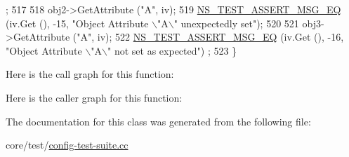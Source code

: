\begin{DoxyCode}
      ;
517 
518   obj2->GetAttribute (\textcolor{stringliteral}{"A"}, iv);
519   \hyperlink{group__testing_ga2a9d78cffb3db8e867c35fff0b698cf5}{NS\_TEST\_ASSERT\_MSG\_EQ} (iv.Get (), -15, \textcolor{stringliteral}{"Object Attribute \(\backslash\)"A\(\backslash\)" unexpectedly set"});
520 
521   obj3->GetAttribute (\textcolor{stringliteral}{"A"}, iv);
522   \hyperlink{group__testing_ga2a9d78cffb3db8e867c35fff0b698cf5}{NS\_TEST\_ASSERT\_MSG\_EQ} (iv.Get (), -16, \textcolor{stringliteral}{"Object Attribute \(\backslash\)"A\(\backslash\)" not set as expected"})
      ;
523 \}
\end{DoxyCode}


Here is the call graph for this function\+:




Here is the caller graph for this function\+:




The documentation for this class was generated from the following file\+:\begin{DoxyCompactItemize}
\item 
core/test/\hyperlink{config-test-suite_8cc}{config-\/test-\/suite.\+cc}\end{DoxyCompactItemize}
